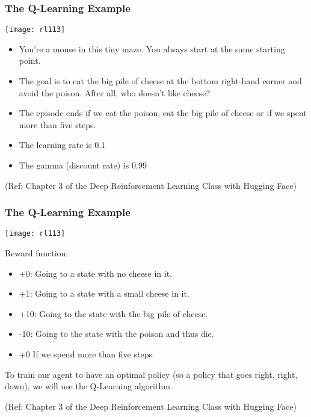 \begin{frame}[fragile]\frametitle{The Q-Learning Example}


\begin{center}
\texttt{[image: rl113]}
\end{center}

\begin{itemize}
\item You're a mouse in this tiny maze. You always start at the same starting point.
\item The goal is to eat the big pile of cheese at the bottom right-hand corner and avoid the poison. After all, who doesn't like cheese?
\item The episode ends if we eat the poison, eat the big pile of cheese or if we spent more than five steps.
\item The learning rate is 0.1
\item The gamma (discount rate) is 0.99
\end{itemize}

{\tiny (Ref: Chapter 3 of the Deep Reinforcement Learning Class with Hugging Face)}

\end{frame}

\begin{frame}[fragile]\frametitle{The Q-Learning Example}


\begin{center}
\texttt{[image: rl113]}
\end{center}

Reward function:

\begin{itemize}
\item +0: Going to a state with no cheese in it.
\item +1: Going to a state with a small cheese in it.
\item +10: Going to the state with the big pile of cheese.
\item -10: Going to the state with the poison and thus die.
\item +0 If we spend more than five steps.
\end{itemize}

To train our agent to have an optimal policy (so a policy that goes right, right, down), we will use the Q-Learning algorithm.


{\tiny (Ref: Chapter 3 of the Deep Reinforcement Learning Class with Hugging Face)}

\end{frame}

